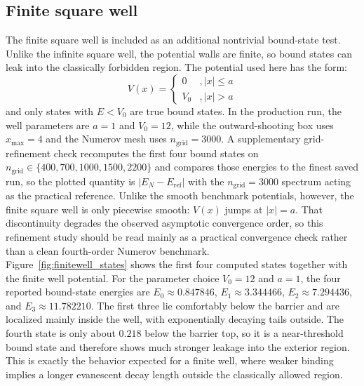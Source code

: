 \documentclass[11pt]{article}
\begin{document}
\begin{refsection}
        \subsection{Finite square well}
            The finite square well is included as an additional nontrivial bound-state test. Unlike the infinite square well, the potential walls are finite, so bound states can leak into the classically forbidden region. The potential used here has the form:
            \begin{equation}
            V(x)=\begin{cases}
            0 & ,|x|\le a\\
            V_0 & ,|x|>a
            \end{cases}
            \end{equation}
            and only states with $E<V_0$ are true bound states. In the production run, the well parameters are $a=1$ and $V_0=12$, while the outward-shooting box uses $x_{\max}=4$ and the Numerov mesh uses $n_{\text{grid}}=3000$. A supplementary grid-refinement check recomputes the first four bound states on $n_{\text{grid}}\in\{400,700,1000,1500,2200\}$ and compares those energies to the finest saved run, so the plotted quantity is $|E_N-E_{\mathrm{ref}}|$ with the $n_{\text{grid}}=3000$ spectrum acting as the practical reference. Unlike the smooth benchmark potentials, however, the finite square well is only piecewise smooth: $V(x)$ jumps at $|x|=a$. That discontinuity degrades the observed asymptotic convergence order, so this refinement study should be read mainly as a practical convergence check rather than a clean fourth-order Numerov benchmark. \\

            Figure~\ref{fig:finitewell_states} shows the first four computed states together with the finite well potential. For the parameter choice $V_0=12$ and $a=1$, the four reported bound-state energies are $E_0\approx0.847846$, $E_1\approx3.344466$, $E_2\approx7.294436$, and $E_3\approx11.782210$. The first three lie comfortably below the barrier and are localized mainly inside the well, with exponentially decaying tails outside. The fourth state is only about $0.218$ below the barrier top, so it is a near-threshold bound state and therefore shows much stronger leakage into the exterior region. This is exactly the behavior expected for a finite well, where weaker binding implies a longer evanescent decay length outside the classically allowed region. \\


\end{refsection}
\end{document}
